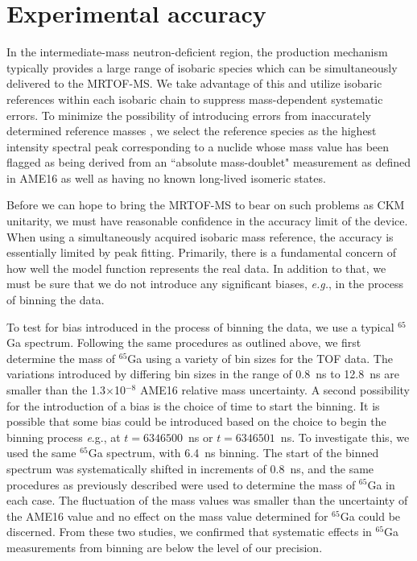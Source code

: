 \documentclass[3p]{elsarticle}
\begin{document}
\section{Experimental accuracy}

In the intermediate-mass neutron-deficient region, the production mechanism typically provides a large range of isobaric species which can be simultaneously delivered to the MRTOF-MS.  We take advantage of this and utilize isobaric references within each isobaric chain to suppress mass-dependent systematic errors.  To minimize the possibility of introducing errors from inaccurately determined reference masses \citep{Schury2007}, we select the reference species as the highest intensity spectral peak corresponding to a nuclide whose mass value has been flagged as being derived from an ``absolute mass-doublet" measurement as defined in AME16 as well as having no known long-lived isomeric states.

Before we can hope to bring the MRTOF-MS to bear on such problems as CKM unitarity, we must have reasonable confidence in the accuracy limit of the device.  When using a simultaneously acquired isobaric mass reference, the accuracy is essentially limited by peak fitting. Primarily, there is a fundamental concern of how well the model function represents the real data.  In addition to that, we must be sure that we do not introduce any significant biases, \emph{e.g.}, in the process of binning the data.

To test for bias introduced in the process of binning the data, we use a typical $^{65}$Ga spectrum.  Following the same procedures as outlined above, we first determine the mass of $^{65}$Ga using a variety of bin sizes for the TOF data.  The variations introduced by differing bin sizes in the range of 0.8~ns to 12.8~ns are smaller than the 1.3$\times$10$^{-8}$ AME16 relative mass uncertainty. A second possibility for the introduction of a bias is the choice of time to start the binning. It is possible that some bias could be introduced based on the choice to begin the binning process {\emph e.g.}, at $t=6346500$~ns or $t=6346501$~ns. To investigate this, we used the same $^{65}$Ga spectrum, with 6.4~ns binning. The start of the binned spectrum was systematically shifted in increments of 0.8~ns, and the same procedures as previously described were used to determine the mass of $^{65}$Ga in each case. The fluctuation of the mass values was smaller than the uncertainty of the AME16 value and no effect on the mass value determined for $^{65}$Ga could be discerned. From these two studies, we confirmed that systematic effects in $^{65}$Ga measurements from binning are below the level of our precision.
\end{document}
